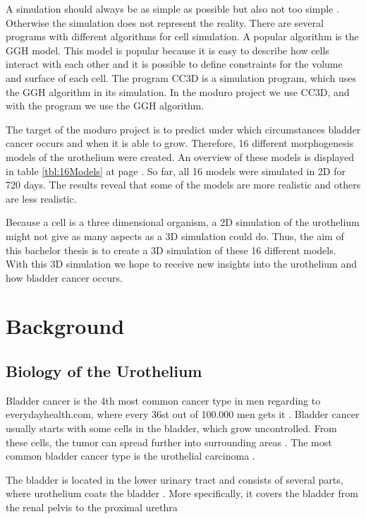 A simulation should always be as simple as possible but also not too simple \cite{REF}. Otherwise the simulation does not represent the reality. 
There are several programs with different algorithms for cell simulation. A popular algorithm is the \ac{GGH} model. This model is popular because it is easy to describe how cells interact with each other and it is possible to define constraints for the volume and surface of each cell. \newline
The program \ac{CC3D} is a simulation program, which uses the \ac{GGH} algorithm in its simulation. In the moduro project we use \ac{CC3D}, and with the program we use the \ac{GGH} algorithm.

The target of the moduro project is to predict under which circumstances bladder cancer occurs and when it is able to grow. Therefore, 16 different morphogenesis models of the urothelium were created. An overview of these models is displayed in table \ref{tbl:16Models} at page \pageref{tbl:16Models}. So far, all 16 models were simulated in 2D for 720 days. The results reveal that some of the models are more realistic and others are less realistic.

Because a cell is a three dimensional organism, a 2D simulation of the urothelium might not give as many aspects as a 3D simulation could do. Thus, the aim of this bachelor thesis is to create a 3D simulation of these 16 different models. With this 3D simulation we hope to receive new insights into the urothelium and how bladder cancer occurs.

\section{Background}
\subsection{Biology of the Urothelium}
Bladder cancer is the 4th most common cancer type in men regarding to everydayhealth.com, where every 36st out of 100.000 men gets it \cite{EveryDayHealth.com}. Bladder cancer usually starts with some cells in the bladder, which grow uncontrolled. From these cells, the tumor can spread further into surrounding areas \cite{Cancer.org}. The most common bladder cancer type is the urothelial carcinoma \cite{Cancer.org}.

The bladder is located in the lower urinary tract and consists of several parts, where urothelium coats the bladder \cite{Lazzeri2006}. More specifically, it covers the bladder from the renal pelvis to the proximal urethra \cite{Yamany2014, Birder2005} 

